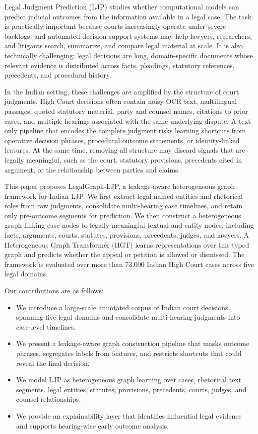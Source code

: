 \documentclass[runningheads]{llncs}
\newcommand{\method}{LegalGraph-LJP}
\begin{document}
Legal Judgment Prediction (LJP) studies whether computational models can predict judicial outcomes from the information available in a legal case. The task is practically important because courts increasingly operate under severe backlogs, and automated decision-support systems may help lawyers, researchers, and litigants search, summarize, and compare legal material at scale. It is also technically challenging: legal decisions are long, domain-specific documents whose relevant evidence is distributed across facts, pleadings, statutory references, precedents, and procedural history.

In the Indian setting, these challenges are amplified by the structure of court judgments. High Court decisions often contain noisy OCR text, multilingual passages, quoted statutory material, party and counsel names, citations to prior cases, and multiple hearings associated with the same underlying dispute. A text-only pipeline that encodes the complete judgment risks learning shortcuts from operative decision phrases, procedural outcome statements, or identity-linked features. At the same time, removing all structure may discard signals that are legally meaningful, such as the court, statutory provisions, precedents cited in argument, or the relationship between parties and claims.

This paper proposes \method{}, a leakage-aware heterogeneous graph framework for Indian LJP. We first extract legal named entities and rhetorical roles from raw judgments, consolidate multi-hearing case timelines, and retain only pre-outcome segments for prediction. We then construct a heterogeneous graph linking case nodes to legally meaningful textual and entity nodes, including facts, arguments, courts, statutes, provisions, precedents, judges, and lawyers. A Heterogeneous Graph Transformer (HGT) learns representations over this typed graph and predicts whether the appeal or petition is allowed or dismissed. The framework is evaluated over more than 73,000 Indian High Court cases across five legal domains.

Our contributions are as follows:
\begin{itemize}[leftmargin=*]
    \item We introduce a large-scale annotated corpus of Indian court decisions spanning five legal domains and consolidate multi-hearing judgments into case-level timelines.
    \item We present a leakage-aware graph construction pipeline that masks outcome phrases, segregates labels from features, and restricts shortcuts that could reveal the final decision.
    \item We model LJP as heterogeneous graph learning over cases, rhetorical text segments, legal entities, statutes, provisions, precedents, courts, judges, and counsel relationships.
    \item We provide an explainability layer that identifies influential legal evidence and supports hearing-wise early outcome analysis.
\end{itemize}
\end{document}
